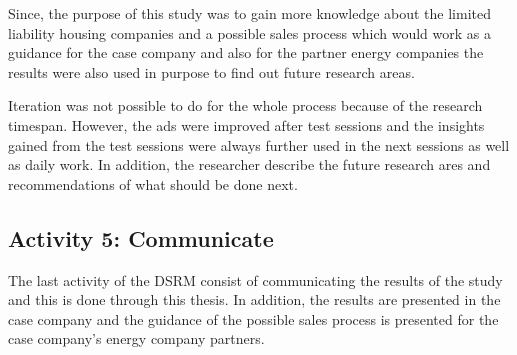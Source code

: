 Since, the purpose of this study was to gain more knowledge about the limited liability housing companies and a possible sales process which would work as a guidance for the case company and also for the partner energy companies the results were also used in purpose to find out future research areas.

Iteration was not possible to do for the whole process because of the research timespan. However, the ads were improved after test sessions and the insights gained from the test sessions were always further used in the next sessions as well as daily work. In addition, the researcher describe the future research ares and recommendations of what should be done next.

\subsection{Activity 5: Communicate}

The last activity of the DSRM consist of communicating the results of the study and this is done through this thesis. In addition, the results are presented in the case company and the guidance of the possible sales process is presented for the case company's energy company partners.






 
